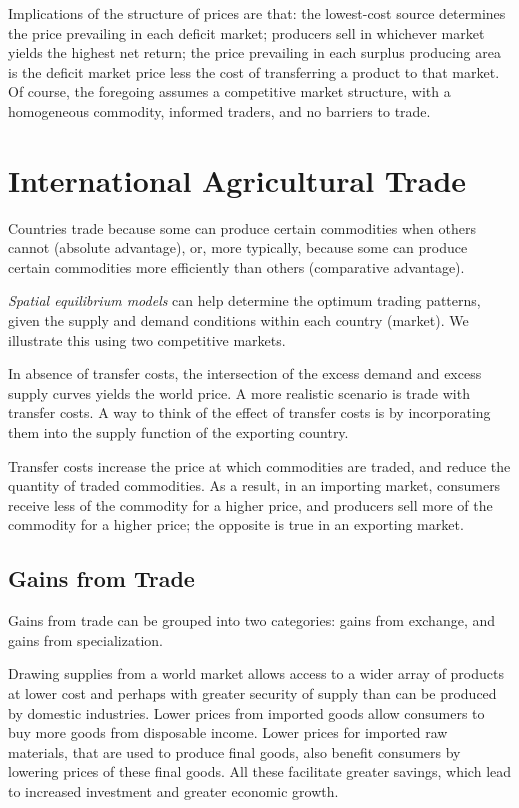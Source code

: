 \documentclass[
]{book}
\begin{document}
Implications of the structure of prices are that: the lowest-cost source determines the price prevailing in each deficit market; producers sell in whichever market yields the highest net return; the price prevailing in each surplus producing area is the deficit market price less the cost of transferring a product to that market. Of course, the foregoing assumes a competitive market structure, with a homogeneous commodity, informed traders, and no barriers to trade.

\hypertarget{international-agricultural-trade}{%
\chapter{International Agricultural Trade}\label{international-agricultural-trade}}

Countries trade because some can produce certain commodities when others cannot (absolute advantage), or, more typically, because some can produce certain commodities more efficiently than others (comparative advantage).

\emph{Spatial equilibrium models} can help determine the optimum trading patterns, given the supply and demand conditions within each country (market). We illustrate this using two competitive markets.

In absence of transfer costs, the intersection of the excess demand and excess supply curves yields the world price. A more realistic scenario is trade with transfer costs. A way to think of the effect of transfer costs is by incorporating them into the supply function of the exporting country.

Transfer costs increase the price at which commodities are traded, and reduce the quantity of traded commodities. As a result, in an importing market, consumers receive less of the commodity for a higher price, and producers sell more of the commodity for a higher price; the opposite is true in an exporting market.

\hypertarget{gains-from-trade}{%
\section{Gains from Trade}\label{gains-from-trade}}

Gains from trade can be grouped into two categories: gains from exchange, and gains from specialization.

Drawing supplies from a world market allows access to a wider array of products at lower cost and perhaps with greater security of supply than can be produced by domestic industries. Lower prices from imported goods allow consumers to buy more goods from disposable income. Lower prices for imported raw materials, that are used to produce final goods, also benefit consumers by lowering prices of these final goods. All these facilitate greater savings, which lead to increased investment and greater economic growth.
\end{document}

